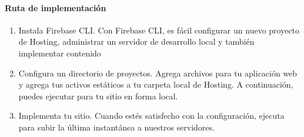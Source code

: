 \paragraph{Ruta de implementación}
\label{\detokenize{chapter_one/firebase:ruta-de-implementacion}}\begin{enumerate}
\item {} 
Instala Firebase CLI. Con Firebase CLI, es fácil configurar un nuevo proyecto de Hosting, administrar un servidor de desarrollo local y también implementar contenido

\item {} 
Configura un directorio de proyectos. Agrega archivos para tu aplicación web y agrega tus activos estáticos a tu carpeta local de Hosting. A continuación, puedes ejecutar  para tu sitio en forma local.

\item {} 
Implementa tu sitio. Cuando estés satisfecho con la configuración, ejecuta  para subir la última instantánea a nuestros servidores.

\end{enumerate}